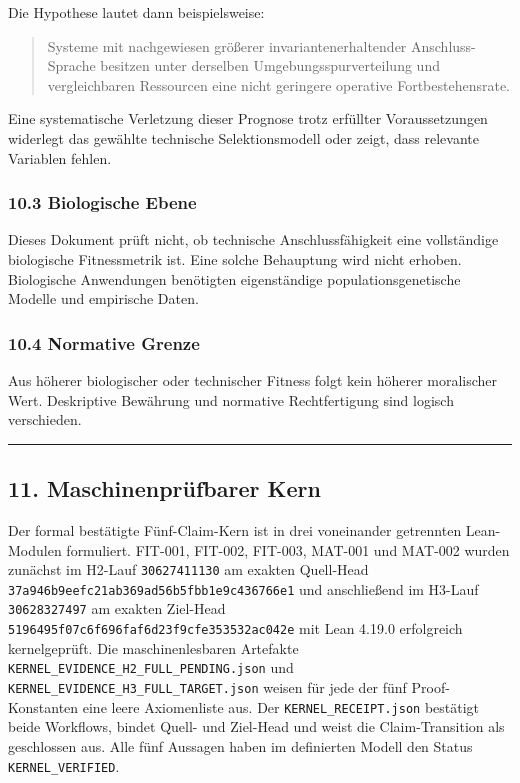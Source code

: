 \documentclass[
  10pt,
  a4paper,
]{article}
\begin{document}
Die Hypothese lautet dann beispielsweise:

\begin{quote}
Systeme mit nachgewiesen größerer invariantenerhaltender
Anschluss-Sprache besitzen unter derselben Umgebungsspurverteilung und
vergleichbaren Ressourcen eine nicht geringere operative
Fortbestehensrate.
\end{quote}

Eine systematische Verletzung dieser Prognose trotz erfüllter
Voraussetzungen widerlegt das gewählte technische Selektionsmodell oder
zeigt, dass relevante Variablen fehlen.

\hypertarget{biologische-ebene}{%
\subsubsection{10.3 Biologische Ebene}\label{biologische-ebene}}

Dieses Dokument prüft nicht, ob technische Anschlussfähigkeit eine
vollständige biologische Fitnessmetrik ist. Eine solche Behauptung wird
nicht erhoben. Biologische Anwendungen benötigten eigenständige
populationsgenetische Modelle und empirische Daten.

\hypertarget{normative-grenze}{%
\subsubsection{10.4 Normative Grenze}\label{normative-grenze}}

Aus höherer biologischer oder technischer Fitness folgt kein höherer
moralischer Wert. Deskriptive Bewährung und normative Rechtfertigung
sind logisch verschieden.

\begin{center}\rule{0.5\linewidth}{0.5pt}\end{center}

\hypertarget{maschinenpruxfcfbarer-kern}{%
\subsection{11. Maschinenprüfbarer
Kern}\label{maschinenpruxfcfbarer-kern}}

Der formal bestätigte Fünf-Claim-Kern ist in drei voneinander getrennten
Lean-Modulen formuliert. FIT-001, FIT-002, FIT-003, MAT-001 und MAT-002
wurden zunächst im H2-Lauf \texttt{30627411130} am exakten Quell-Head
\texttt{37a946b9eefc21ab369ad56b5fbb1e9c436766e1} und anschließend im
H3-Lauf \texttt{30628327497} am exakten Ziel-Head
\texttt{5196495f07c6f696faf6d23f9cfe353532ac042e} mit Lean 4.19.0
erfolgreich kernelgeprüft. Die maschinenlesbaren Artefakte
\texttt{KERNEL\_EVIDENCE\_H2\_FULL\_PENDING.json} und
\texttt{KERNEL\_EVIDENCE\_H3\_FULL\_TARGET.json} weisen für jede der
fünf Proof-Konstanten eine leere Axiomenliste aus. Der
\texttt{KERNEL\_RECEIPT.json} bestätigt beide Workflows, bindet Quell-
und Ziel-Head und weist die Claim-Transition als geschlossen aus. Alle
fünf Aussagen haben im definierten Modell den Status
\texttt{KERNEL\_VERIFIED}.
\end{document}
